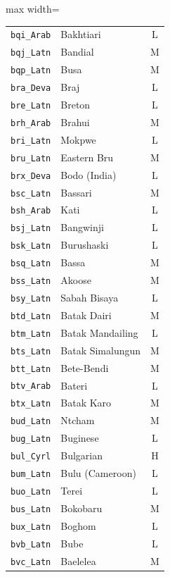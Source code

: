 {\begin{adjustbox}{max width=\textwidth}
\begin{tabular}{llc}
        \texttt{bqi\_Arab} & Bakhtiari & L \\
        \texttt{bqj\_Latn} & Bandial & M \\
        \texttt{bqp\_Latn} & Busa & M \\
        \texttt{bra\_Deva} & Braj & L \\
        \texttt{bre\_Latn} & Breton & L \\
        \texttt{brh\_Arab} & Brahui & M \\
        \texttt{bri\_Latn} & Mokpwe & L \\
        \texttt{bru\_Latn} & Eastern Bru & M \\
        \texttt{brx\_Deva} & Bodo (India) & L \\
        \texttt{bsc\_Latn} & Bassari & M \\
        \texttt{bsh\_Arab} & Kati & L \\
        \texttt{bsj\_Latn} & Bangwinji & L \\
        \texttt{bsk\_Latn} & Burushaski & L \\
        \texttt{bsq\_Latn} & Bassa & M \\
        \texttt{bss\_Latn} & Akoose & M \\
        \texttt{bsy\_Latn} & Sabah Bisaya & L \\
        \texttt{btd\_Latn} & Batak Dairi & M \\
        \texttt{btm\_Latn} & Batak Mandailing & L \\
        \texttt{bts\_Latn} & Batak Simalungun & M \\
        \texttt{btt\_Latn} & Bete-Bendi & M \\
        \texttt{btv\_Arab} & Bateri & L \\
        \texttt{btx\_Latn} & Batak Karo & M \\
        \texttt{bud\_Latn} & Ntcham & M \\
        \texttt{bug\_Latn} & Buginese & L \\
        \texttt{bul\_Cyrl} & Bulgarian & H \\
        \texttt{bum\_Latn} & Bulu (Cameroon) & L \\
        \texttt{buo\_Latn} & Terei & L \\
        \texttt{bus\_Latn} & Bokobaru & M \\
        \texttt{bux\_Latn} & Boghom & L \\
        \texttt{bvb\_Latn} & Bube & L \\
        \texttt{bvc\_Latn} & Baelelea & M \\

\end{tabular}
\end{adjustbox}}
